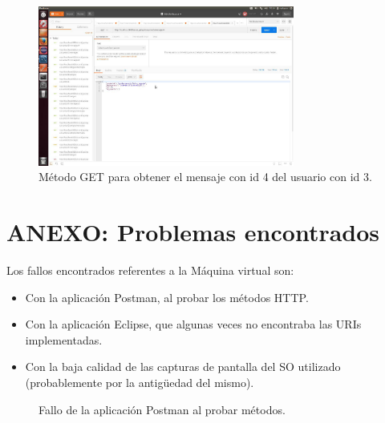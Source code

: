 \documentclass[12pt,a4paper, spanish]{article}
\begin{document}
\begin{figure}[H]
	\centering
	\includegraphics[width=0.75\textwidth]{images/captura25.jpg}
	\caption{Método GET para obtener el mensaje con id 4 del usuario con id 3.}
\end{figure}

\newpage
\section{ANEXO: Problemas encontrados}

Los fallos encontrados referentes a la Máquina virtual son:

\begin{itemize}
	\item Con la aplicación Postman, al probar los métodos HTTP.
	\item Con la aplicación Eclipse, que algunas veces no encontraba las URIs implementadas.
	\item Con la baja calidad de las capturas de pantalla del SO utilizado (probablemente por la antigüedad del mismo).
\end{itemize} 

\begin{figure}[H]
	\centering
	\caption{Fallo de la aplicación Postman al probar métodos.}
\end{figure}
\end{document}

